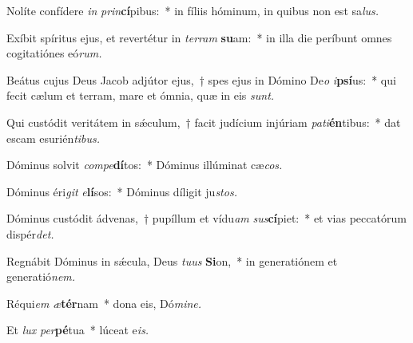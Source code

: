 \item Nolíte confídere \textit{in} \textit{prin}\textbf{cí}pibus:~* in fíliis hóminum, in quibus non est sa\tinyhspace\textit{lus.}
\item Exíbit spíritus ejus, et revertétur in \textit{terram} \textbf{su}am:~* in illa die períbunt omnes cogitatiónes eó\textit{rum.}
\item Beátus cujus Deus Jacob adjútor ejus,~† spes ejus in Dómino De\textit{o} \textit{i}\textbf{psí}us:~* qui fecit cælum et terram, mare et ómnia, quæ in eis \textit{sunt.}
\item Qui custódit veritátem in sǽculum,~† facit judícium injúriam \textit{pati}\textbf{én}tibus:~* dat escam esurién\textit{tibus.}
\item Dóminus solvit \textit{compe}\textbf{dí}tos:~* Dóminus illúminat cæ\tinyhspace\textit{cos.}
\item Dóminus éri\textit{git} \textit{e}\textbf{lí}sos:~* Dóminus díligit ju\tinyhspace\textit{stos.}
\item Dóminus custódit ádvenas,~† pupíllum et vídu\tinyhspace\textit{am} \textit{sus}\textbf{cí}piet:~* et vias peccatórum dispér\textit{det.}
\item Regnábit Dóminus in sǽcula, Deus \textit{tuus} \textbf{Si}on,~* in generatiónem et generatió\textit{nem.}
\item Réqui\tinyhspace\textit{em} \textit{æ}\textbf{tér}nam~* dona eis, Dó\textit{mine.}
\item Et \textit{lux} \textit{per}\textbf{pé}tua~* lúceat e\tinyhspace\textit{is.}